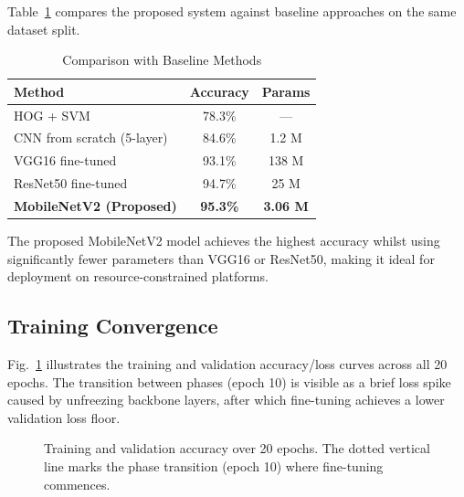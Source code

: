 \documentclass[journal,10pt,twocolumn]{IEEEtran}
\begin{document}
Table~\ref{tab:comparison} compares the proposed system against baseline
approaches on the same dataset split.

\begin{table}[H]
\centering
\caption{Comparison with Baseline Methods}
\label{tab:comparison}
\begin{tabular}{lcc}
\toprule
\textbf{Method} & \textbf{Accuracy} & \textbf{Params} \\
\midrule
HOG + SVM \cite{stallkamp2012man}   & 78.3\% & — \\
CNN from scratch (5-layer)          & 84.6\% & 1.2 M \\
VGG16 fine-tuned \cite{simonyan2014very} & 93.1\% & 138 M \\
ResNet50 fine-tuned \cite{he2016deep}    & 94.7\% & 25 M \\
\textbf{MobileNetV2 (Proposed)}     & \textbf{95.3\%} & \textbf{3.06 M} \\
\bottomrule
\end{tabular}
\end{table}

The proposed MobileNetV2 model achieves the highest accuracy whilst using
significantly fewer parameters than VGG16 or ResNet50, making it ideal for
deployment on resource-constrained platforms.

\subsection{Training Convergence}

Fig.~\ref{fig:curves} illustrates the training and validation accuracy/loss
curves across all 20 epochs. The transition between phases (epoch 10) is
visible as a brief loss spike caused by unfreezing backbone layers, after which
fine-tuning achieves a lower validation loss floor.

\begin{figure}[H]
\centering
{}
\caption{Training and validation accuracy over 20 epochs. The dotted vertical
line marks the phase transition (epoch 10) where fine-tuning commences.}
\label{fig:curves}
\end{figure}
\end{document}
